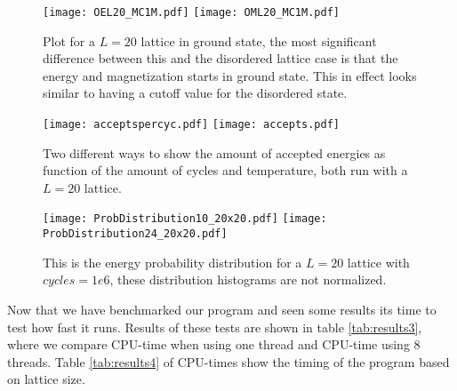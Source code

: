 \documentclass{emulateapj}
\begin{document}
%
\begin{figure}[H]
{{\texttt{[image: OEL20\_MC1M.pdf]}}
}\qquad
{{\texttt{[image: OML20\_MC1M.pdf]}}
}\qquad
\caption{Plot for a $L=20$ lattice in ground state, the most significant difference between this and the disordered lattice case is that the energy and magnetization starts in ground state. This in effect looks similar to having a cutoff value for the disordered state.}
\label{fig:Ordered}
\end{figure}
%
%
\begin{figure}[H]
{{\texttt{[image: acceptspercyc.pdf]}}
}\qquad
{{\texttt{[image: accepts.pdf]}}
}\qquad
\caption{Two different ways to show the amount of accepted energies as function of the amount of cycles and temperature, both run with a $L=20$ lattice.}
\label{fig:accepts}
\end{figure}
%
%
\begin{figure}[H]
{{\texttt{[image: ProbDistribution10\_20x20.pdf]}}
}\qquad
{{\texttt{[image: ProbDistribution24\_20x20.pdf]}}
}\qquad
\caption{This is the energy probability distribution for a $L=20$ lattice with $cycles=1e6$, these distribution histograms are not normalized.}
\label{fig:PD}
\end{figure}
%
Now that we have benchmarked our program and seen some results its time to test how fast it runs. Results of these tests are shown in table \ref{tab:results3}, where we compare CPU-time when using one thread and CPU-time using 8 threads. Table \ref{tab:results4} of CPU-times show the timing of the program based on lattice size.
\end{document}
